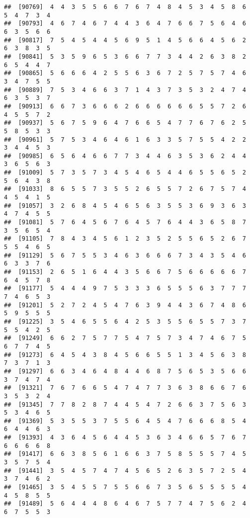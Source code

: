 \documentclass[
]{book}
\begin{document}
\begin{verbatim}
##  [90769]  4  4  3  5  5  6  6  7  6  7  4  8  4  5  3  4  5  8  6  5  4  7  3  4
##  [90793]  4  6  7  4  6  7  4  4  3  6  4  7  6  6  7  5  6  4  6  6  3  5  6  6
##  [90817]  7  5  4  5  4  4  5  6  9  5  1  4  5  6  6  4  5  6  2  6  3  8  3  5
##  [90841]  5  3  5  9  6  5  3  6  6  7  7  3  4  4  2  6  3  8  2  6  5  4  4  7
##  [90865]  5  6  6  6  4  2  5  5  6  3  6  7  2  5  7  5  7  4  6  3  4  7  5  5
##  [90889]  7  5  3  4  6  6  3  7  1  4  3  7  3  5  3  2  4  7  4  6  3  5  3  7
##  [90913]  6  6  7  3  6  6  6  2  6  6  6  6  6  6  5  5  7  2  6  4  5  5  7  2
##  [90937]  5  6  7  5  9  6  4  7  6  6  5  4  7  7  6  7  6  2  5  5  8  5  3  3
##  [90961]  5  7  5  3  4  6  4  6  1  6  3  3  5  7  5  5  4  2  2  3  4  4  5  3
##  [90985]  6  5  6  4  6  6  7  7  3  4  4  6  3  5  3  6  2  4  4  3  6  5  6  3
##  [91009]  5  7  3  5  7  3  4  5  4  6  5  4  4  6  5  5  6  5  2  5  6  4  3  8
##  [91033]  8  6  5  5  7  3  5  5  2  6  5  5  7  2  6  7  5  7  4  4  5  4  1  5
##  [91057]  3  2  6  8  4  5  4  6  5  6  3  5  5  3  6  9  3  6  3  4  7  4  5  5
##  [91081]  5  7  6  4  5  6  7  6  4  5  7  6  4  4  3  6  5  8  7  3  5  6  5  4
##  [91105]  7  8  4  3  4  5  6  1  2  3  5  2  5  5  6  5  2  6  7  5  5  4  6  5
##  [91129]  5  6  7  5  5  3  4  6  3  6  6  6  7  3  4  3  5  4  6  6  3  3  7  6
##  [91153]  2  6  5  1  6  4  4  3  5  6  6  7  5  6  6  6  6  6  7  6  4  5  7  8
##  [91177]  5  4  4  4  9  7  5  3  3  3  6  5  5  5  6  3  7  7  7  7  4  6  5  3
##  [91201]  5  2  7  2  4  5  4  7  6  3  9  4  4  3  6  7  4  8  6  5  9  5  5  5
##  [91225]  3  5  4  6  5  5  6  4  2  5  3  5  5  6  5  5  7  3  7  5  5  4  2  5
##  [91249]  6  6  2  7  5  7  7  5  4  7  5  7  3  4  7  4  6  7  5  6  7  7  4  5
##  [91273]  6  4  5  4  3  8  4  5  6  6  5  5  1  3  4  5  6  3  8  7  3  7  1  3
##  [91297]  6  6  3  4  6  4  8  4  4  6  8  7  5  6  5  3  5  6  6  3  7  4  7  4
##  [91321]  7  6  7  6  6  5  4  7  4  7  7  3  6  3  8  6  6  7  6  3  5  3  2  4
##  [91345]  7  7  8  2  8  7  4  4  5  4  7  2  6  6  3  7  5  6  3  5  3  4  6  5
##  [91369]  5  3  5  5  3  7  5  5  6  4  5  4  7  6  6  6  8  5  4  6  4  4  6  3
##  [91393]  4  3  6  4  5  6  4  4  5  3  6  3  4  6  6  5  7  6  7  6  6  6  6  8
##  [91417]  6  6  3  8  5  6  1  6  6  3  7  5  8  5  5  5  7  4  5  3  5  7  5  4
##  [91441]  3  5  4  5  7  4  7  4  5  6  5  2  6  3  5  7  2  5  4  3  7  4  6  2
##  [91465]  3  5  4  5  5  7  5  5  6  6  7  3  5  6  5  5  5  5  4  4  5  8  5  5
##  [91489]  5  6  4  4  4  8  6  4  6  7  5  7  7  4  7  5  6  2  4  6  7  5  5  3

\end{verbatim}
\end{document}
